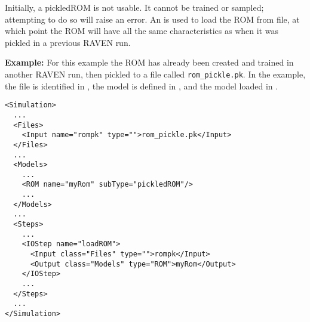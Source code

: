 Initially, a pickledROM is not usable.  It cannot be trained or sampled; attempting to do so will raise an
error.  An  is used to load the ROM from file, at which point the ROM will have all the same
characteristics as when it was pickled in a previous RAVEN run.

\textbf{Example:}
For this example the ROM has already been created and trained in another RAVEN run, then pickled to a file
called \texttt{rom\_pickle.pk}.  In the example, the file is identified in , the model is
defined in , and the model loaded in .
{\footnotesize
\begin{lstlisting}[style=XML,morekeywords={name,subType}]
<Simulation>
  ...
  <Files>
    <Input name="rompk" type="">rom_pickle.pk</Input>
  </Files>
  ...
  <Models>
    ...
    <ROM name="myRom" subType="pickledROM"/>
    ...
  </Models>
  ...
  <Steps>
    ...
    <IOStep name="loadROM">
      <Input class="Files" type="">rompk</Input>
      <Output class="Models" type="ROM">myRom</Output>
    </IOStep>
    ...
  </Steps>
  ...
</Simulation>
\end{lstlisting}
}


